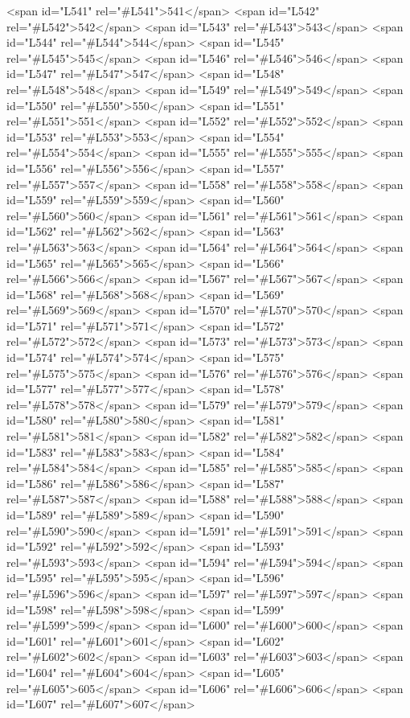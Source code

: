 <span id="L541" rel="#L541">541</span>
<span id="L542" rel="#L542">542</span>
<span id="L543" rel="#L543">543</span>
<span id="L544" rel="#L544">544</span>
<span id="L545" rel="#L545">545</span>
<span id="L546" rel="#L546">546</span>
<span id="L547" rel="#L547">547</span>
<span id="L548" rel="#L548">548</span>
<span id="L549" rel="#L549">549</span>
<span id="L550" rel="#L550">550</span>
<span id="L551" rel="#L551">551</span>
<span id="L552" rel="#L552">552</span>
<span id="L553" rel="#L553">553</span>
<span id="L554" rel="#L554">554</span>
<span id="L555" rel="#L555">555</span>
<span id="L556" rel="#L556">556</span>
<span id="L557" rel="#L557">557</span>
<span id="L558" rel="#L558">558</span>
<span id="L559" rel="#L559">559</span>
<span id="L560" rel="#L560">560</span>
<span id="L561" rel="#L561">561</span>
<span id="L562" rel="#L562">562</span>
<span id="L563" rel="#L563">563</span>
<span id="L564" rel="#L564">564</span>
<span id="L565" rel="#L565">565</span>
<span id="L566" rel="#L566">566</span>
<span id="L567" rel="#L567">567</span>
<span id="L568" rel="#L568">568</span>
<span id="L569" rel="#L569">569</span>
<span id="L570" rel="#L570">570</span>
<span id="L571" rel="#L571">571</span>
<span id="L572" rel="#L572">572</span>
<span id="L573" rel="#L573">573</span>
<span id="L574" rel="#L574">574</span>
<span id="L575" rel="#L575">575</span>
<span id="L576" rel="#L576">576</span>
<span id="L577" rel="#L577">577</span>
<span id="L578" rel="#L578">578</span>
<span id="L579" rel="#L579">579</span>
<span id="L580" rel="#L580">580</span>
<span id="L581" rel="#L581">581</span>
<span id="L582" rel="#L582">582</span>
<span id="L583" rel="#L583">583</span>
<span id="L584" rel="#L584">584</span>
<span id="L585" rel="#L585">585</span>
<span id="L586" rel="#L586">586</span>
<span id="L587" rel="#L587">587</span>
<span id="L588" rel="#L588">588</span>
<span id="L589" rel="#L589">589</span>
<span id="L590" rel="#L590">590</span>
<span id="L591" rel="#L591">591</span>
<span id="L592" rel="#L592">592</span>
<span id="L593" rel="#L593">593</span>
<span id="L594" rel="#L594">594</span>
<span id="L595" rel="#L595">595</span>
<span id="L596" rel="#L596">596</span>
<span id="L597" rel="#L597">597</span>
<span id="L598" rel="#L598">598</span>
<span id="L599" rel="#L599">599</span>
<span id="L600" rel="#L600">600</span>
<span id="L601" rel="#L601">601</span>
<span id="L602" rel="#L602">602</span>
<span id="L603" rel="#L603">603</span>
<span id="L604" rel="#L604">604</span>
<span id="L605" rel="#L605">605</span>
<span id="L606" rel="#L606">606</span>
<span id="L607" rel="#L607">607</span>
